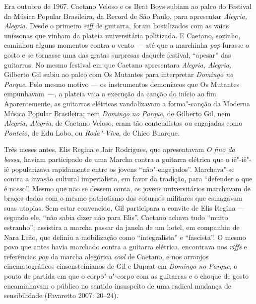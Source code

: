 Era outubro de 1967. Caetano Veloso e os Beat Boys
subiam ao palco do  Festival da Música Popular Brasileira, da 
Record de São Paulo, para apresentar \emph{Alegria, Alegria. }Desde o
primeiro \emph{riff} de guitarra, foram hostilizados com as vaias
uníssonas que vinham da plateia universitária politizada. E Caetano,
sozinho, caminhou alguns momentos contra o vento --- até que a marchinha
\emph{pop} furasse o gosto e se tornasse uma das gratas surpresas
daquele festival, ``apesar'' das guitarras. No mesmo festival em que
Caetano apresentara \emph{Alegria, Alegria,} Gilberto Gil subiu ao palco
com Os Mutantes para interpretar \emph{Domingo no Parque}. Pelo mesmo
motivo --- os instrumentos demoníacos que Os Mutantes empunhavam~---, a
plateia vaia a execução da canção do início ao fim. Aparentemente, as
guitarras elétricas vandalizavam a forma"-canção da Moderna Música
Popular Brasileira; nem \emph{Domingo no Parque}, de Gilberto Gil, nem
\emph{Alegria, Alegria}, de Caetano Veloso, eram tão conteudistas ou
engajadas como \emph{Ponteio}, de Edu Lobo, ou \emph{Roda"-Viva},
de Chico Buarque.

Três meses antes, Elis Regina e Jair Rodrigues, que apresentavam \emph{O
fino da bossa}, haviam participado de uma Marcha contra a guitarra
elétrica que o iê"-iê"-iê popularizava rapidamente entre os jovens
``não"-engajados''. Marchava"-se contra a invasão cultural imperialista,
em favor da tradição, para ``defender o que é nosso''. Mesmo que não se
dessem conta, os jovens universitários marchavam de braços dados com o
mesmo patriotismo dos coturnos militares que esmagavam suas utopias. Sem
estar convencido, Gil participara a convite de Elis Regina --- segundo
ele, ``não sabia dizer não para Elis''. Caetano achava tudo ``muito
estranho''; assistira a marcha passar da janela de um hotel, em
companhia de Nara Leão, que definiu a mobilização como ``integralista''
e ``fascista''. O mesmo povo que antes havia marchado contra a guitarra
elétrica, encontrava nos \emph{riffs }e referências \emph{pop} da marcha
alegórica \emph{cool }de Caetano, e nos arranjos cinematográficos
einsensteinianos de Gil e Duprat em \emph{Domingo no Parque}, o
ponto de partida em que o corpo"-a"-corpo com as guitarras e o choque de
gosto encaminhavam o público no sentido insuspeito de uma radical
mudança de sensibilidade (Favaretto 2007: 20--24).

